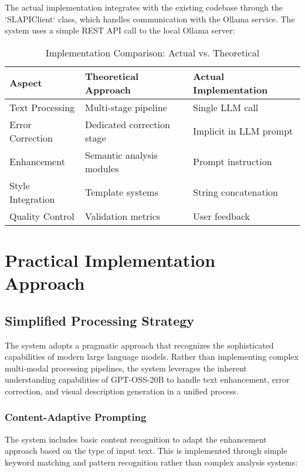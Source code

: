 The actual implementation integrates with the existing codebase through the `SLAPIClient` class, which handles communication with the Ollama service. The system uses a simple REST API call to the local Ollama server:

\begin{table}[H]
\centering
\caption{Implementation Comparison: Actual vs. Theoretical}
\label{tab:implementation_comparison}
{\begin{tabular}{lll}
\toprule
\textbf{Aspect} & \textbf{Theoretical Approach} & \textbf{Actual Implementation} \\
\midrule
Text Processing & Multi-stage pipeline & Single LLM call \\
Error Correction & Dedicated correction stage & Implicit in LLM prompt \\
Enhancement & Semantic analysis modules & Prompt instruction \\
Style Integration & Template systems & String concatenation \\
Quality Control & Validation metrics & User feedback \\
\bottomrule
\end{tabular}}
\end{table}

\section{Practical Implementation Approach}

\subsection{Simplified Processing Strategy}

The system adopts a pragmatic approach that recognizes the sophisticated capabilities of modern large language models. Rather than implementing complex multi-modal processing pipelines, the system leverages the inherent understanding capabilities of GPT-OSS-20B to handle text enhancement, error correction, and visual description generation in a unified process.

\subsubsection{Content-Adaptive Prompting}

The system includes basic content recognition to adapt the enhancement approach based on the type of input text. This is implemented through simple keyword matching and pattern recognition rather than complex analysis systems:

